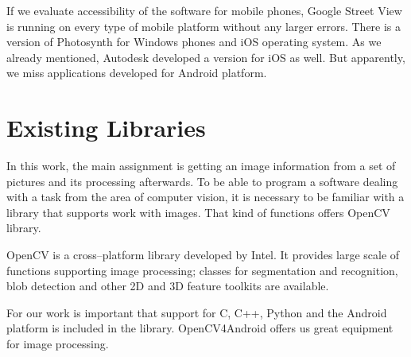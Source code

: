 If we evaluate accessibility of the software for mobile phones, Google Street 
View is running on every type of mobile platform without any larger errors. There is a 
version of Photosynth for Windows phones and iOS operating system. As we already 
mentioned, Autodesk developed a version for iOS as well. But apparently, we miss 
applications developed for Android platform.


\section{Existing Libraries}
In this work, the main assignment is getting an image information from a set of 
pictures and its processing afterwards.
To be able to program a software dealing with a task from the area of computer 
vision, it is necessary to be familiar with a library that supports work with 
images. That kind of functions offers OpenCV library. 

OpenCV is a cross–platform library developed by Intel. It provides large scale 
of functions supporting image processing; classes for segmentation and 
recognition, blob detection and other 2D and 3D feature toolkits are available.

For our work is important that support for C, C++, Python and the Android 
platform is included in the library. OpenCV4Android offers us great 
equipment for image processing. 





















